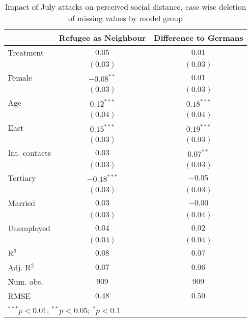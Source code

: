 
\begin{table}
\caption{Impact of July attacks on perceived social distance, case-wise deletion of missing values by model group}
\begin{center}
\begin{tabular}{l c c}
\toprule
 & Refugee as Neighbour & Difference to Germans \\
\midrule
Treatment     & $0.05$        & $0.01$       \\
              & $(0.03)$      & $(0.03)$     \\
Female        & $-0.08^{**}$  & $0.01$       \\
              & $(0.03)$      & $(0.03)$     \\
Age           & $0.12^{***}$  & $0.18^{***}$ \\
              & $(0.04)$      & $(0.04)$     \\
East          & $0.15^{***}$  & $0.19^{***}$ \\
              & $(0.03)$      & $(0.03)$     \\
Int. contacts & $0.03$        & $0.07^{**}$  \\
              & $(0.03)$      & $(0.03)$     \\
Tertiary      & $-0.18^{***}$ & $-0.05$      \\
              & $(0.03)$      & $(0.03)$     \\
Married       & $0.03$        & $-0.00$      \\
              & $(0.03)$      & $(0.04)$     \\
Unemployed    & $0.04$        & $0.02$       \\
              & $(0.04)$      & $(0.04)$     \\
\midrule
R$^2$         & $0.08$        & $0.07$       \\
Adj. R$^2$    & $0.07$        & $0.06$       \\
Num. obs.     & $909$         & $909$        \\
RMSE          & $0.48$        & $0.50$       \\
\bottomrule
\multicolumn{3}{l}{\scriptsize{$^{***}p<0.01$; $^{**}p<0.05$; $^{*}p<0.1$}}
\end{tabular}
\label{tab_dist_na_group}
\end{center}
\end{table}
